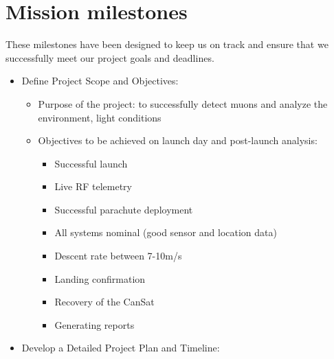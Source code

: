 \section{Mission milestones}\label{A33}


These milestones have been designed to keep us on track and ensure that we successfully meet our project goals and deadlines.
\begin{itemize}[leftmargin=1cm, itemindent=0.25cm, noitemsep, topsep=0pt, label=$\bullet$]
    \item Define Project Scope and Objectives:
    \begin{itemize}[label=, noitemsep, topsep=0pt]
        \item Purpose of the project: to successfully detect muons and analyze the environment, light conditions
        \item Objectives to be achieved on launch day and post-launch analysis:
        \begin{multicols}{2}
        \setlength{\topsep}{0pt}
        \setlength{\partopsep}{0pt}
        \begin{itemize}[label=, noitemsep, topsep=0pt]
        \item Successful launch
        \item Live RF telemetry
        \item Successful parachute deployment
        \item All systems nominal (good sensor and location data)
        \item Descent rate between 7-10m/s
        \item Landing confirmation
        \item Recovery of the CanSat
        \item Generating reports
        \end{itemize}
        \end{multicols}
    \end{itemize}
    \item Develop a Detailed Project Plan and Timeline:
    \begin{itemize}[label=, noitemsep, topsep=0pt]

\end{itemize}
\end{itemize}
